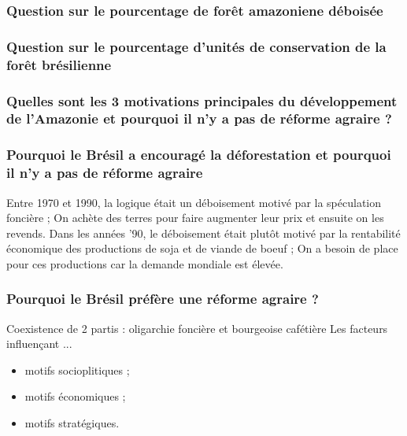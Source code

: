 \subsubsection{Question sur le pourcentage de forêt amazoniene déboisée}
\color{cyan}
\color{black}

\subsubsection{Question sur le pourcentage d'unités de conservation de la forêt brésilienne}
\color{cyan}
\color{black}

\subsubsection{Quelles sont les 3 motivations principales du développement de l'Amazonie et pourquoi il n'y a pas de réforme agraire ?}
\color{cyan}
\color{black}

\subsubsection{Pourquoi le Brésil a encouragé la déforestation et pourquoi il n'y a pas de réforme agraire}
\color{cyan}
Entre 1970 et 1990, la logique était un déboisement motivé par la spéculation foncière ; On achète des terres pour faire augmenter leur prix et ensuite on les revends. Dans les années '90, le déboisement était plutôt motivé par la rentabilité économique des productions de soja et de viande de boeuf ; On a besoin de place pour ces productions car la demande mondiale est élevée.
\color{black}

\subsubsection{Pourquoi le Brésil préfère une réforme agraire ?}
\color{cyan}
Coexistence de 2 partis : oligarchie foncière et bourgeoise cafétière
Les facteurs influençant ...
\begin{itemize}
\item motifs socioplitiques ;
\item  motifs économiques ;
\item motifs stratégiques.
\end{itemize}
\color{black}